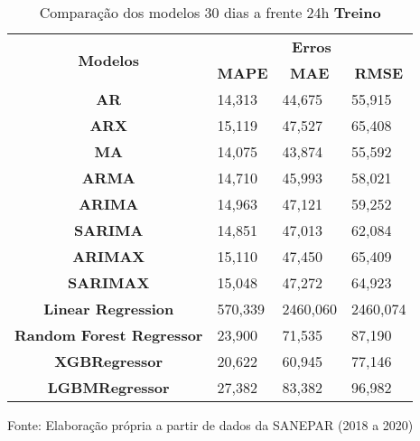 \begin{table}[H]
	\centering
	\caption{Comparação dos modelos 30 dias a frente 24h \textbf{Treino} }\label{tb:60-24trn}
	\begin{tabular}{@{}clll@{}}
		\toprule
		\multirow{2}{*}{\textbf{Modelos}} & \multicolumn{3}{c}{\textbf{Erros}}                                                                       \\ \cmidrule(l){2-4} 
		& \multicolumn{1}{c}{\textbf{MAPE}} & \multicolumn{1}{c}{\textbf{MAE}} & \multicolumn{1}{c}{\textbf{RMSE}} \\ \hline
\textbf{AR}                       & 14,313                            & 44,675                           & 55,915                            \\
\textbf{ARX}                      & 15,119                            & 47,527                           & 65,408                            \\
\textbf{MA}                       & 14,075                            & 43,874                           & 55,592                            \\
\textbf{ARMA}                     & 14,710                            & 45,993                           & 58,021                            \\
\textbf{ARIMA}                    & 14,963                            & 47,121                           & 59,252                            \\
\textbf{SARIMA}                   & 14,851                            & 47,013                           & 62,084                            \\
\textbf{ARIMAX}                   & 15,110                            & 47,450                           & 65,409                            \\
\textbf{SARIMAX}                  & 15,048                            & 47,272                           & 64,923                            \\
\textbf{Linear Regression}        & 570,339                           & 2460,060                         & 2460,074                          \\
\textbf{Random Forest Regressor}  & 23,900                            & 71,535                           & 87,190                            \\
\textbf{XGBRegressor}             & 20,622                            & 60,945                           & 77,146                            \\
\textbf{LGBMRegressor}            & 27,382                            & 83,382                           & 96,982                            \\ \bottomrule
	\end{tabular}

Fonte: Elaboração própria a partir de dados da SANEPAR (2018 a 2020)
\end{table}

